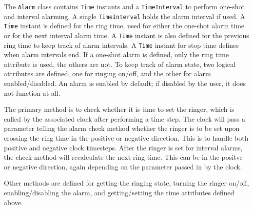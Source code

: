 
The {\tt Alarm} class contains {\tt Time} instants and a {\tt TimeInterval}
to perform one-shot and interval alarming.  A single {\tt TimeInterval}
holds the alarm interval if used.  A {\tt Time} instant is defined for the
ring time, used for either the one-shot alarm time or for the next interval
alarm time.  A {\tt Time} instant is also defined for the previous ring
time to keep track of alarm intervals.  A {\tt Time} instant for stop time
defines when alarm intervals end.  If a one-shot alarm is defined, only
the ring time attribute is used, the others are not.  To keep track of
alarm state, two logical attributes are defined, one for ringing on/off,
and the other for alarm enabled/disabled.  An alarm is enabled by default;
if disabled by the user, it does not function at all.

The primary method is to check whether it is time to set the ringer, which
is called by the associated clock after performing a time step.  The clock
will pass a parameter telling the alarm check method whether the ringer is
to be set upon crossing the ring time in the positive or negative direction.
This is to handle both positive and negative clock timesteps.  After the
ringer is set for interval alarms, the check method will recalculate the
next ring time.  This can be in the positve or negative direction, again
depending on the parameter passed in by the clock.

Other methods are defined for getting the ringing state, turning the
ringer on/off, enabling/disabling the alarm, and getting/setting the
time attributes defined above.

